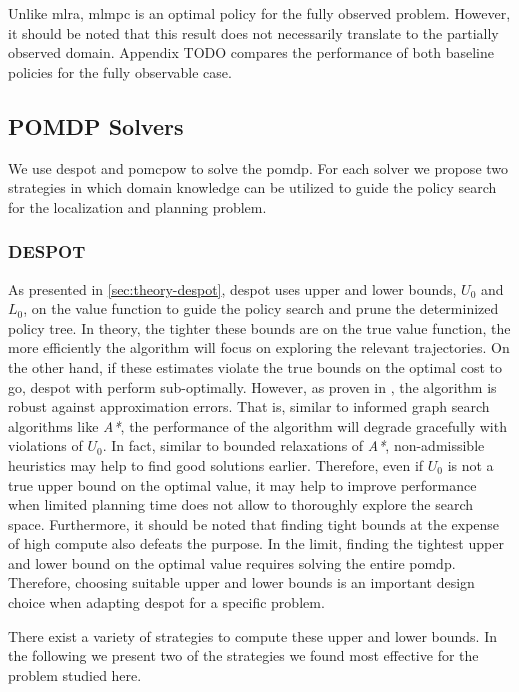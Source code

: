 Unlike \ac{mlra}, \ac{mlmpc} is an optimal policy for the fully observed
problem. However, it should be noted that this result does not necessarily
translate to the partially observed domain. Appendix TODO compares the performance of both baseline policies for the fully
observable case.

\subsection{POMDP Solvers}\label{sec:lp-planners}

We use \ac{despot} and \ac{pomcpow} to solve the \ac{pomdp}. For each solver we
propose two strategies in which domain knowledge can be utilized to guide the
policy search for the localization and planning problem.

\subsubsection{DESPOT}\label{sec:lp-planners-despot}

As presented in \cref{sec:theory-despot}, \ac{despot} uses upper and lower
bounds, $U_0$ and $L_0$, on the value function to guide the policy search and
prune the determinized policy tree. In theory, the tighter these bounds are on
the true value function, the more efficiently the algorithm will focus on
exploring the relevant trajectories. On the other hand, if these estimates
violate the true bounds on the optimal cost to go, \ac{despot} with perform
sub-optimally. However, as proven in \cite{somani2013despot}, the algorithm is
robust against approximation errors. That is, similar to informed graph search
algorithms like \emph{A*}, the performance of the algorithm will degrade
gracefully with violations of $U_0$. In fact, similar to bounded relaxations of
\emph{A*}, non-admissible heuristics may help to find good solutions earlier.
Therefore, even if $U_0$ is not a true upper bound on the optimal value, it may
help to improve performance when limited planning time does not allow to
thoroughly explore the search space. Furthermore, it should be noted that
finding tight bounds at the expense of high compute also defeats the purpose.
In the limit, finding the tightest upper and lower bound on the optimal value
requires solving the entire \ac{pomdp}. Therefore, choosing suitable upper and
lower bounds is an important design choice when adapting \ac{despot} for
a specific problem.

There exist a variety of strategies to compute these upper and lower bounds.
In the following we present two of the strategies we found most effective for
the problem studied here.

